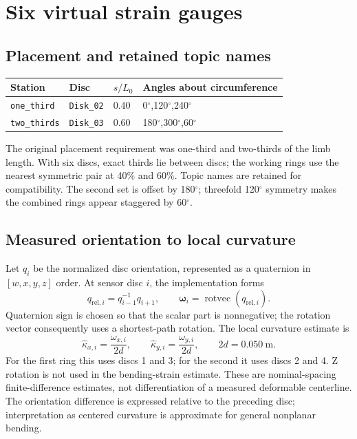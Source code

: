\documentclass[11pt,letterpaper]{article}
\newcommand{\degrees}{\ensuremath{^{\circ}}}
\begin{document}
\section{Six virtual strain gauges}
\subsection{Placement and retained topic names}
\begin{center}
\begin{tabular}{llll}
\toprule
Station & Disc & $s/L_0$ & Angles about circumference\\\midrule
\texttt{one\_third} & \texttt{Disk\_02} & 0.40 & 0\degrees{},120\degrees{},240\degrees{}\\
\texttt{two\_thirds} & \texttt{Disk\_03} & 0.60 & 180\degrees{},300\degrees{},60\degrees{}\\
\bottomrule
\end{tabular}
\end{center}
The original placement requirement was one-third and two-thirds of the limb
length. With six discs, exact thirds lie between discs; the working rings
use the nearest symmetric pair at 40\% and 60\%. Topic names are retained
for compatibility. The second set is offset by 180\degrees{}; threefold
120\degrees{} symmetry makes the combined rings appear staggered by 60\degrees{}.

\subsection{Measured orientation to local curvature}
Let $q_i$ be the normalized disc orientation, represented as a quaternion
in $[w,x,y,z]$ order. At sensor disc $i$, the implementation forms
\begin{equation}
q_{\mathrm{rel},i}=q_{i-1}^{-1}q_{i+1},\qquad
\boldsymbol{\omega}_i=\operatorname{rotvec}(q_{\mathrm{rel},i}).
\end{equation}
Quaternion sign is chosen so that the scalar part is nonnegative; the rotation
vector consequently uses a shortest-path rotation. The local curvature
estimate is
\begin{equation}
\hat\kappa_{x,i}=\frac{\omega_{x,i}}{2d},\qquad
\hat\kappa_{y,i}=\frac{\omega_{y,i}}{2d},\qquad 2d=0.050~\mathrm{m}.
\label{eq:kappa}
\end{equation}
For the first ring this uses discs 1 and 3; for the second it uses discs 2 and 4.
Z rotation is not used in the bending-strain estimate. These are nominal-spacing
finite-difference estimates, not differentiation of a measured deformable
centerline. The orientation difference is expressed relative to the preceding
disc; interpretation as centered curvature is approximate for general
nonplanar bending.
\end{document}
